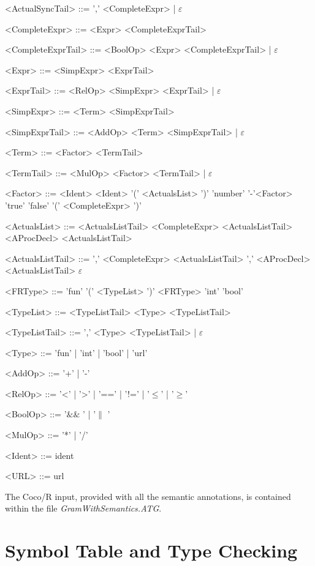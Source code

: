 \begin{grammar}
<ActualSyncTail> ::= ',' <CompleteExpr> | $\varepsilon$

<CompleteExpr> ::= <Expr> <CompleteExprTail> 

<CompleteExprTail> ::= <BoolOp> <Expr> <CompleteExprTail> | $\varepsilon$
		  
<Expr> ::= <SimpExpr> <ExprTail>

<ExprTail> ::=  <RelOp> <SimpExpr> <ExprTail> | $\varepsilon$
	  
<SimpExpr> ::= <Term> <SimpExprTail>

<SimpExprTail> ::=  <AddOp> <Term> <SimpExprTail> | $\varepsilon$

<Term> ::= <Factor> <TermTail>

<TermTail> ::= <MulOp> <Factor> <TermTail> | $\varepsilon$

<Factor> ::= 
		<Ident>
		\alt <Ident> '(' <ActualsList> ')' 
		\alt 'number' 
		\alt '-'<Factor> 	
		\alt 'true' 
		\alt 'false' 
		\alt '(' <CompleteExpr> ')'
		
<ActualsList> ::= 	<ActualsListTail> 
					 <ActualsListTail>
					\alt <AProcDecl> <ActualsListTail>

<ActualsListTail> ::= 	',' <CompleteExpr> <ActualsListTail>
						\alt ',' <AProcDecl> <ActualsListTail>
						\alt $\varepsilon$					
		
<FRType> ::= 'fun' '(' <TypeList> ')' <FRType>
			\alt 'int' 
			\alt 'bool'

<TypeList> ::= 	<TypeListTail> 
				\alt <Type> <TypeListTail>

<TypeListTail> ::= ',' <Type> <TypeListTail> | $\varepsilon$	
			
<Type> ::= 'fun' | 'int' | 'bool' | 'url'

<AddOp> ::= '+' | '-'
	  
<RelOp> ::= '<' | '>' | '==' | '!=' | '$\leq$' | '$\geq$'
		  
<BoolOp> ::= '$\& \&$ ' | '$\|$ '

<MulOp> ::= '*' | '/'

<Ident> ::= ident

<URL> ::= url	

\end{grammar}

The Coco/R input, provided with all the semantic annotations, is contained within the file \textit{GramWithSemantics.ATG}.

\section{\label{typecheck}Symbol Table and Type Checking}

